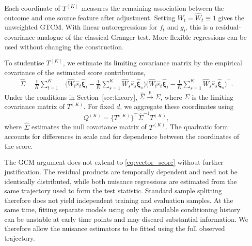 \documentclass[12pt]{article}
\numberwithin{equation}{section}
\begin{document}
Each coordinate of \(T^{(K)}\) measures the remaining association between the outcome and one source feature after adjustment. Setting \(W_t=\hat W_t\equiv1\) gives the unweighted GTCM. With linear autoregressions for \(f_t\) and \(g_t\), this is a residual-covariance analogue of the classical Granger test. More flexible regressions can be used without changing the construction.


To studentise \(T^{(K)}\), we estimate its limiting covariance matrix by the
empirical covariance of the estimated score contributions,
\begin{equation}
\begin{split}
    \hat\Sigma
    =
    \frac{1}{K}\sum_{t=1}^K
    &\Big(
        \hat W_t\hat\varepsilon_t\hat{\boldsymbol{\xi}}_t
        -
        \frac{1}{K}\sum_{s=1}^K
        \hat W_s\hat\varepsilon_s\hat{\boldsymbol{\xi}}_s
    \Big) 
    \Big(
        \hat W_t\hat\varepsilon_t\hat{\boldsymbol{\xi}}_t
        -
        \frac{1}{K}\sum_{s=1}^K
        \hat W_s\hat\varepsilon_s\hat{\boldsymbol{\xi}}_s
    \Big)^{\top}.
    \label{eq:covariance_estimator}
\end{split}
\end{equation}
Under the conditions in Section~\ref{sec:theory}, $\hat\Sigma\xrightarrow{p}\Sigma$, where $\Sigma$ is the limiting covariance matrix of $T^{(K)}$. For fixed $d$, we aggregate these coordinates using
\begin{equation}
    Q^{(K)}
    =
    \{T^{(K)}\}^{\top}
    \hat\Sigma^{-1}
    T^{(K)},
    \label{eq:quadratic_stat}
\end{equation}
where \(\hat\Sigma\) estimates the null covariance matrix of \(T^{(K)}\). The quadratic form accounts for differences in scale and for dependence between the coordinates of the score.

The GCM argument does not extend to \eqref{eq:vector_score} without further justification. The residual products are temporally dependent and need not be identically distributed, while both nuisance regressions are estimated from the same trajectory used to form the test statistic. Standard sample splitting therefore does not yield independent training and evaluation samples. At the same time, fitting separate models using only the available conditioning history can be unstable at early time points and may discard substantial information. We therefore allow the nuisance estimators to be fitted using the full observed trajectory.
\end{document}
